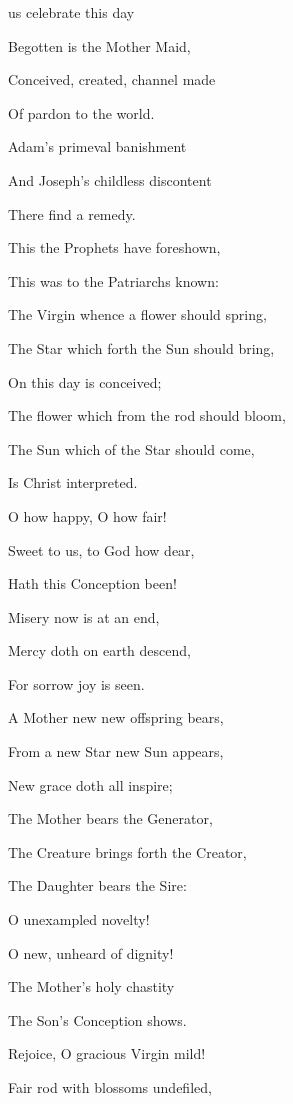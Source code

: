 \begin{multicols}{2}
 us celebrate this day\par
{}
Begotten is the Mother Maid,

Conceived, created, channel made

Of pardon to the world.

Adam's primeval banishment

And Joseph's childless discontent

There find a remedy.\\
\par
This the Prophets have foreshown,

This was to the Patriarchs known:

The Virgin whence a flower should spring,

The Star which forth the Sun should bring,

On this day is conceived;

The flower which from the rod should bloom,

The Sun which of the Star should come,

Is Christ interpreted.\\
\par
O how happy, O how fair!

Sweet to us, to God how dear,

Hath this Conception been!

Misery now is at an end,

Mercy doth on earth descend,

For sorrow joy is seen.

A Mother new new offspring bears,

From a new Star new Sun appears,

New grace doth all inspire;

The Mother bears the Generator,

The Creature brings forth the Creator,

The Daughter bears the Sire:\\
\par
O unexampled novelty!

O new, unheard of dignity!

The Mother's holy chastity

The Son's Conception shows.

Rejoice, O gracious Virgin mild!

Fair rod with blossoms undefiled,


\end{multicols}
